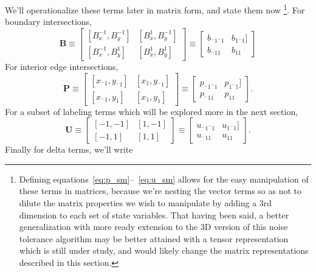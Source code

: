 We'll operationalize these terms later in matrix form, and state them now \footnote{
    Defining equations~\ref{eq:p_sm}--~\ref{eq:u_sm} allows for the easy manipulation
    of these terms in matrices, because we're nesting the vector terms so as not to dilute
    the matrix properties we wish to manipulate by adding a 3rd dimension to each set of state
    variables.  That having been said, a better generalization with more ready extension to
    the 3D version of this noise tolerance algorithm may be better attained with a tensor
    representation which is still under study, and would likely change the
    matrix representations described in this section.
  }.  For boundary intersections,
\begin{equation}
  \mathbf{B} \equiv \begin{bmatrix}
    [B_x^{-1}, B_y^{-1}] & [B_x^{1}, B_y^{-1}] \\
    [B_x^{-1}, B_y^{1}] & [B_x^{1}, B_y^{1}]
    \end{bmatrix} \equiv \begin{bmatrix}
      b_{^-1^-1} & b_{1^-1}] \\
      b_{^-11} & b_{11}
      \end{bmatrix}
      \label{eq:B}
\end{equation}
For interior edge intersections,
\begin{equation}
  \mathbf{P} \equiv \begin{bmatrix}
    [x_{^-1}, y_{^-1}] & [x_1, y_{^-1}] \\
    [x_{^-1}, y_1] & [x_1, y_1]
  \end{bmatrix} \equiv \begin{bmatrix}
    p_{^-1^-1} & p_{1^-1}] \\
    p_{^-11} & p_{11}
    \end{bmatrix}.
  \label{eq:P}
\end{equation}
For a subset of labeling terms which will be explored
more in the next section,
\begin{equation}
\mathbf{U} \equiv \begin{bmatrix}
  [-1, -1] & [1, -1] \\
  [-1, 1] & [1, 1]
  \end{bmatrix} \equiv \begin{bmatrix}
    u_{^-1^-1} & u_{1^-1}] \\
    u_{^-11} & u_{11}
    \end{bmatrix}.
  \label{eq:indices}
\end{equation}
Finally for delta terms, we'll write
